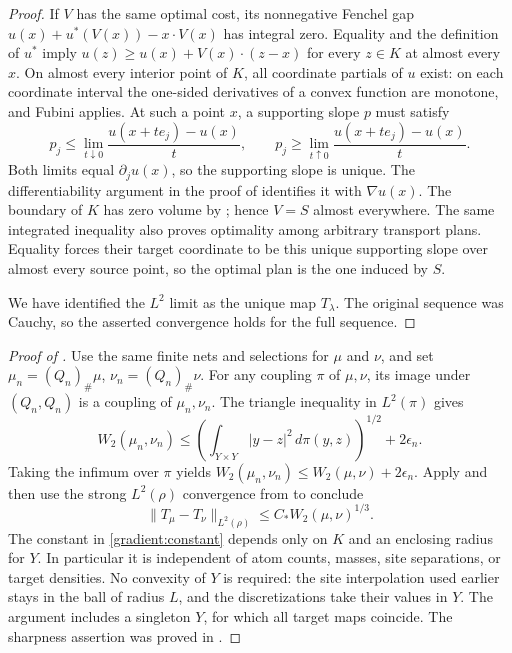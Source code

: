 \begin{proof}
If $V$ has the same optimal cost, its nonnegative Fenchel gap
$u(x)+u^*(V(x))-x\cdot V(x)$ has integral zero. Equality and the
definition of $u^*$ imply
$u(z)\ge u(x)+V(x)\cdot(z-x)$ for every $z\in K$ at almost every $x$.
On almost every interior point of $K$, all coordinate
partials of $u$ exist: on each coordinate interval the one-sided
derivatives of a convex function are monotone, and Fubini applies.
At such a point $x$, a supporting slope $p$ must satisfy
\[
 p_j\le\lim_{t\downarrow0}\frac{u(x+te_j)-u(x)}{t},
 \qquad
 p_j\ge\lim_{t\uparrow0}\frac{u(x+te_j)-u(x)}{t}.
\]
Both limits equal $\partial_j u(x)$, so the supporting slope is
unique.  The differentiability argument in the proof of
 identifies it with $\nabla u(x)$.
The boundary of $K$ has zero volume by ; hence
$V=S$ almost everywhere.
The same integrated inequality also proves optimality among arbitrary
transport plans.  Equality forces their target coordinate to be this
unique supporting slope over almost every source point, so the optimal
plan is the one induced by $S$.

We have identified the $L^2$ limit as the unique map $T_\lambda$.
The original sequence was Cauchy, so the asserted convergence holds
for the full sequence.
\end{proof}

\begin{proof}[Proof of ]
Use the same finite nets and selections for $\mu$ and $\nu$, and set
$\mu_n=(Q_n)_\#\mu$, $\nu_n=(Q_n)_\#\nu$.  For any coupling
$\pi$ of $\mu,\nu$, its image under $(Q_n,Q_n)$ is a coupling of
$\mu_n,\nu_n$.  The triangle inequality in $L^2(\pi)$ gives
\[
 W_2(\mu_n,\nu_n)
 \le\left(\int_{Y\times Y}|y-z|^2\,d\pi(y,z)\right)^{1/2}
       +2\epsilon_n.
\]
Taking the infimum over $\pi$ yields
$W_2(\mu_n,\nu_n)\le W_2(\mu,\nu)+2\epsilon_n$.
Apply  and then use the strong $L^2(\rho)$
convergence from  to conclude
\[
 \|T_\mu-T_\nu\|_{L^2(\rho)}
 \le C_*W_2(\mu,\nu)^{1/3}.
\]
The constant in \eqref{gradient:constant} depends only on $K$ and an
enclosing radius for $Y$.  In particular it is independent of atom
counts, masses, site separations, or target densities.  No convexity
of $Y$ is required: the site interpolation used earlier stays in the
ball of radius $L$, and the discretizations take their values in $Y$.
The argument includes a singleton $Y$, for which all target maps
coincide.
The sharpness assertion was proved in .
\end{proof}
